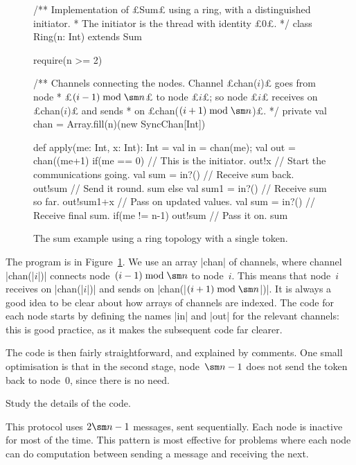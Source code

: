 \begin{figure}
\begin{scala}
/** Implementation of £Sum£ using a ring, with a distinguished initiator.
  * The initiator is the thread with identity £0£. */
class Ring(n: Int) extends Sum{
  require(n >= 2)

  /** Channels connecting the nodes.  Channel £chan($i$)£ goes from node
    * £$(i-1)\bmod \sm n$£ to node £$i$£; so node £$i$£ receives on £chan($i$)£ and sends
    * on £chan($(i+1)\bmod \sm n$)£. */
  private val chan = Array.fill(n)(new SyncChan[Int])
 
  def apply(me: Int, x: Int): Int = {
    val in = chan(me); val out = chan((me+1)%
    if(me == 0){                  // This is the initiator.
      out!x                       // Start the communications going.
      val sum = in?()             // Receive sum back.
      out!sum                     // Send it round.
      sum
    }
    else{
      val sum1 = in?()            // Receive sum so far.
      out!sum1+x                  // Pass on updated values.
      val sum = in?()             // Receive final sum.
      if(me != n-1) out!sum   // Pass it on.
      sum
    }
  } 
}
\end{scala}
\caption{The sum example using a ring topology with a single token.}
\label{fig:sum-ring1}
\end{figure}


The program is in Figure~\ref{fig:sum-ring1}.  We use an array |chan| of
channels, where channel |chan(|$i$|)| connects node~$(i-1)\bmod \sm n$ to
node~$i$.  This means that node~$i$ receives on |chan(|$i$|)| and sends on
|chan(|$(i+1)\bmod \sm n$|)|.  It is always a good idea to be clear about how
arrays of channels are indexed.  The code for each node starts by defining the
names |in| and |out| for the relevant channels: this is good practice, as it
makes the subsequent code far clearer.

The code is then fairly straightforward, and explained by comments.  One small
optimisation is that in the second stage, node~$\sm n - 1$ does not send the
token back to node~$0$, since there is no need.
%
\begin{instruction}
Study the details of the code. 
\end{instruction}

This protocol uses $2\sm n-1$ messages, sent sequentially.  Each node is
inactive for most of the time.  This pattern is most effective for problems
where each node can do computation between sending a message and receiving the
next. 


